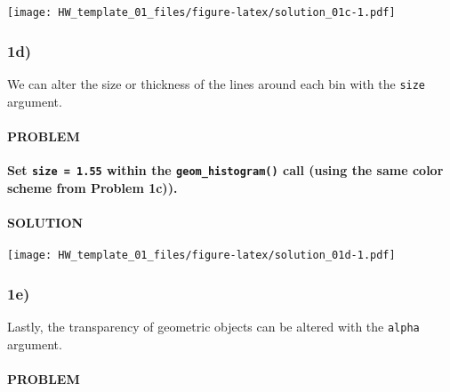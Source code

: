 \documentclass[]{article}
\newenvironment{Shaded}{\begin{snugshade}}{\end{snugshade}}
\newcommand{\DataTypeTok}[1]{\textcolor[rgb]{0.13,0.29,0.53}{#1}}
\newcommand{\DecValTok}[1]{\textcolor[rgb]{0.00,0.00,0.81}{#1}}
\newcommand{\FloatTok}[1]{\textcolor[rgb]{0.00,0.00,0.81}{#1}}
\newcommand{\KeywordTok}[1]{\textcolor[rgb]{0.13,0.29,0.53}{\textbf{#1}}}
\newcommand{\NormalTok}[1]{#1}
\newcommand{\OperatorTok}[1]{\textcolor[rgb]{0.81,0.36,0.00}{\textbf{#1}}}
\newcommand{\StringTok}[1]{\textcolor[rgb]{0.31,0.60,0.02}{#1}}
\let\oldparagraph\paragraph
\renewcommand{\paragraph}[1]{\oldparagraph{#1}\mbox{}}
\begin{document}
\texttt{[image: HW\_template\_01\_files/figure-latex/solution\_01c-1.pdf]}

\hypertarget{d}{%
\subsubsection{1d)}\label{d}}

We can alter the size or thickness of the lines around each bin with the
\texttt{size} argument.

\hypertarget{problem-4}{%
\paragraph{PROBLEM}\label{problem-4}}

\textbf{Set \texttt{size\ =\ 1.55} within the \texttt{geom\_histogram()}
call (using the same color scheme from Problem 1c)).}

\hypertarget{solution-3}{%
\paragraph{SOLUTION}\label{solution-3}}

\begin{Shaded}
\end{Shaded}

\texttt{[image: HW\_template\_01\_files/figure-latex/solution\_01d-1.pdf]}

\hypertarget{e}{%
\subsubsection{1e)}\label{e}}

Lastly, the transparency of geometric objects can be altered with the
\texttt{alpha} argument.

\hypertarget{problem-5}{%
\paragraph{PROBLEM}\label{problem-5}}
\end{document}
